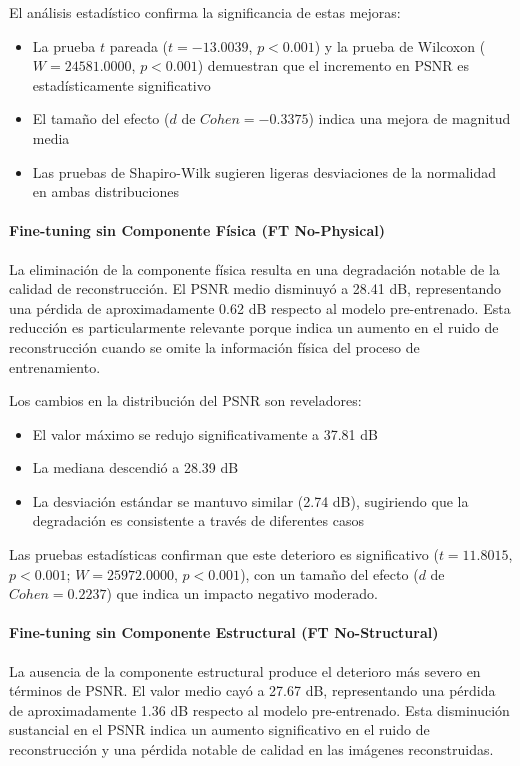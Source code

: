 El análisis estadístico confirma la significancia de estas mejoras:

\begin{itemize}
    \item La prueba $t$ pareada ($t = -13.0039$, $p < 0.001$) y la prueba de Wilcoxon ($W = 24581.0000$, $p < 0.001$) demuestran que el incremento en PSNR es estadísticamente significativo
    \item El tamaño del efecto ($d$ de $Cohen = -0.3375$) indica una mejora de magnitud media
    \item Las pruebas de Shapiro-Wilk sugieren ligeras desviaciones de la normalidad en ambas distribuciones
\end{itemize}

\paragraph{Fine-tuning sin Componente Física (FT No-Physical)}
La eliminación de la componente física resulta en una degradación notable de la calidad de reconstrucción. El PSNR medio disminuyó a 28.41 dB, representando una pérdida de aproximadamente 0.62 dB respecto al modelo pre-entrenado. Esta reducción es particularmente relevante porque indica un aumento en el ruido de reconstrucción cuando se omite la información física del proceso de entrenamiento.

Los cambios en la distribución del PSNR son reveladores:

\begin{itemize}
    \item El valor máximo se redujo significativamente a 37.81 dB
    \item La mediana descendió a 28.39 dB
    \item La desviación estándar se mantuvo similar (2.74 dB), sugiriendo que la degradación es consistente a través de diferentes casos
\end{itemize}

Las pruebas estadísticas confirman que este deterioro es significativo ($t = 11.8015$, $p < 0.001$; $W = 25972.0000$, $p < 0.001$), con un tamaño del efecto ($d$ de $Cohen = 0.2237$) que indica un impacto negativo moderado.

\paragraph{Fine-tuning sin Componente Estructural (FT No-Structural)}
La ausencia de la componente estructural produce el deterioro más severo en términos de PSNR. El valor medio cayó a 27.67 dB, representando una pérdida de aproximadamente 1.36 dB respecto al modelo pre-entrenado. Esta disminución sustancial en el PSNR indica un aumento significativo en el ruido de reconstrucción y una pérdida notable de calidad en las imágenes reconstruidas.

